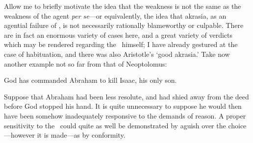 \documentclass[11pt,letterpaper,oneside]{amsart}
\begin{document}
Allow me to briefly motivate the idea that the weakness  is not the same as the weakness of the agent \emph{per se}---or equivalently, the idea that akrasia, as an agential failure of \enk, is not necessarily rationally blameworthy or culpable. There are in fact an enormous variety of cases here, and a great variety of verdicts which may be rendered regarding the \ak\ himself; I have already gestured at the case of habituation, and there was also Aristotle's `good akrasia.' Take now another example not so far from that of Neoptolomus:\begin{squote} God has commanded Abraham to kill Isaac, his only son.\end{squote} Suppose that Abraham had been less resolute, and had shied away from the deed before God stopped his hand. It is quite unnecessary to suppose he would then have been somehow inadequately responsive to the demands of reason. A proper sensitivity to the \enk\ could quite as well be demonstrated by aguish over the choice---however it is made---as by conformity.





\end{document}
